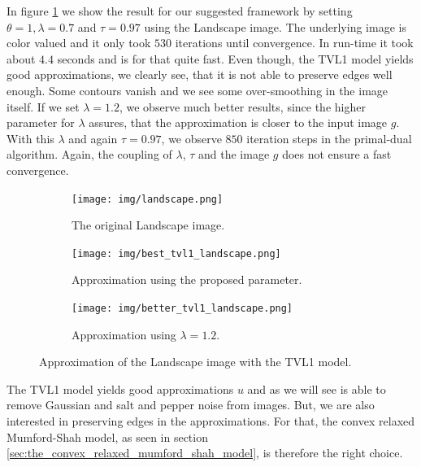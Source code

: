 \documentclass{scrreprt}
\begin{document}
                In figure \ref{fig:best_tvl1_landscape} we show the result for our suggested framework by setting $\theta = 1, \lambda = 0.7$ and $\tau = 0.97$ using the Landscape image. The underlying image is color valued and it only took $530$ iterations until convergence. In run-time it took about $4.4$ seconds and is for that quite fast. Even though, the TVL1 model yields good approximations, we clearly see, that it is not able to preserve edges well enough. Some contours vanish and we see some over-smoothing in the image itself. If we set $\lambda = 1.2$, we observe much better results, since the higher parameter for $\lambda$ assures, that the approximation is closer to the input image $g$. With this $\lambda$ and again $\tau = 0.97$, we observe $850$ iteration steps in the primal-dual algorithm. Again, the coupling of $\lambda$, $\tau$ and the image $g$ does not ensure a fast convergence.

                \begin{figure}[!ht]
                    \centering
                    \begin{subfigure}[b]{0.32\textwidth}
                        \texttt{[image: img/landscape.png]}
                        \caption{The original Landscape image.}
                    \end{subfigure}
                    \begin{subfigure}[b]{0.32\textwidth}
                        \texttt{[image: img/best\_tvl1\_landscape.png]}
                        \caption{Approximation using the proposed parameter.}
                    \end{subfigure}
                    \begin{subfigure}[b]{0.32\textwidth}
                        \texttt{[image: img/better\_tvl1\_landscape.png]}
                        \caption{Approximation using $\lambda = 1.2$.}
                    \end{subfigure}
                    \caption[Best approximation using the TVL1 model with Landscape image.]{Approximation of the Landscape image with the TVL1 model.}
                    \label{fig:best_tvl1_landscape}
                \end{figure}

                The TVL1 model yields good approximations $u$ and as we will see is able to remove Gaussian and salt and pepper noise from images. But, we are also interested in preserving edges in the approximations. For that, the convex relaxed Mumford-Shah model, as seen in section \ref{sec:the_convex_relaxed_mumford_shah_model}, is therefore the right choice.
\end{document}
